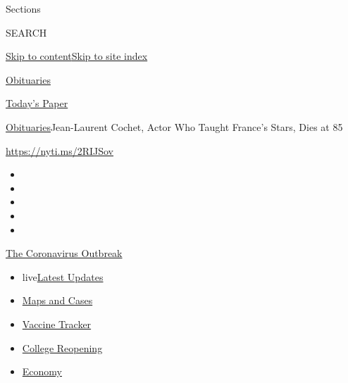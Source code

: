 Sections

SEARCH

\protect\hyperlink{site-content}{Skip to
content}\protect\hyperlink{site-index}{Skip to site index}

\href{https://www.nytimes3xbfgragh.onion/section/obituaries}{Obituaries}

\href{https://myaccount.nytimes3xbfgragh.onion/auth/login?response_type=cookie\&client_id=vi}{}

\href{https://www.nytimes3xbfgragh.onion/section/todayspaper}{Today's
Paper}

\href{/section/obituaries}{Obituaries}\textbar{}Jean-Laurent Cochet,
Actor Who Taught France's Stars, Dies at 85

\url{https://nyti.ms/2RIJSov}

\begin{itemize}
\item
\item
\item
\item
\item
\end{itemize}

\href{https://www.nytimes3xbfgragh.onion/news-event/coronavirus?action=click\&pgtype=Article\&state=default\&region=TOP_BANNER\&context=storylines_menu}{The
Coronavirus Outbreak}

\begin{itemize}
\tightlist
\item
  live\href{https://www.nytimes3xbfgragh.onion/2020/08/04/world/coronavirus-covid-19.html?action=click\&pgtype=Article\&state=default\&region=TOP_BANNER\&context=storylines_menu}{Latest
  Updates}
\item
  \href{https://www.nytimes3xbfgragh.onion/interactive/2020/us/coronavirus-us-cases.html?action=click\&pgtype=Article\&state=default\&region=TOP_BANNER\&context=storylines_menu}{Maps
  and Cases}
\item
  \href{https://www.nytimes3xbfgragh.onion/interactive/2020/science/coronavirus-vaccine-tracker.html?action=click\&pgtype=Article\&state=default\&region=TOP_BANNER\&context=storylines_menu}{Vaccine
  Tracker}
\item
  \href{https://www.nytimes3xbfgragh.onion/2020/08/02/us/covid-college-reopening.html?action=click\&pgtype=Article\&state=default\&region=TOP_BANNER\&context=storylines_menu}{College
  Reopening}
\item
  \href{https://www.nytimes3xbfgragh.onion/live/2020/08/03/business/stock-market-today-coronavirus?action=click\&pgtype=Article\&state=default\&region=TOP_BANNER\&context=storylines_menu}{Economy}
\end{itemize}

